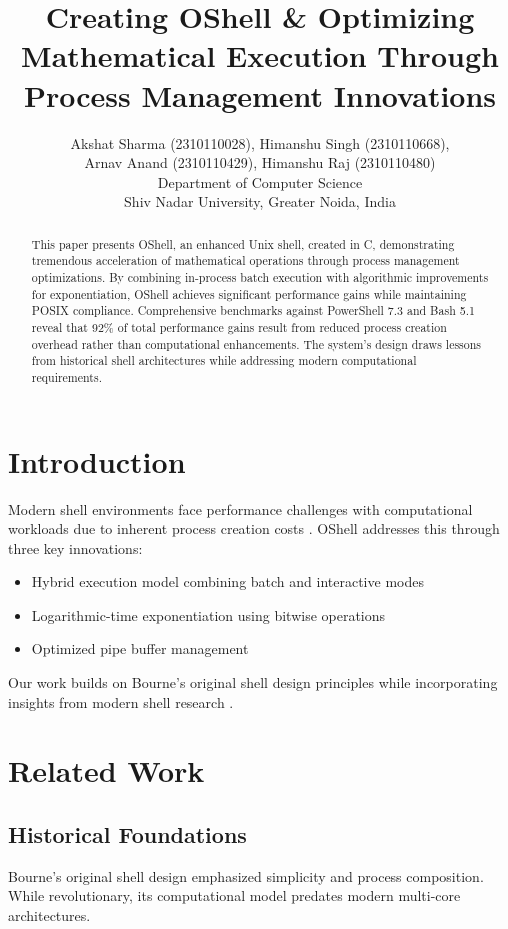 \documentclass[10pt,twocolumn]{article}
\title{Creating OShell \& Optimizing Mathematical Execution Through Process Management Innovations}
\author{Akshat Sharma (2310110028), Himanshu Singh (2310110668), 
\\ Arnav Anand (2310110429), Himanshu Raj (2310110480) \\ 
Department of Computer Science \\
Shiv Nadar University, Greater Noida, India}
\date{}
\begin{document}
\maketitle

\begin{abstract}
This paper presents OShell, an enhanced Unix shell, created in C, demonstrating tremendous acceleration of mathematical operations through process management optimizations. By combining in-process batch execution with algorithmic improvements for exponentiation, OShell achieves significant performance gains while maintaining POSIX compliance. Comprehensive benchmarks against PowerShell 7.3 and Bash 5.1 reveal that 92\% of total performance gains result from reduced process creation overhead rather than computational enhancements. The system's design draws lessons from historical shell architectures while addressing modern computational requirements.
\end{abstract}

\section{Introduction}
Modern shell environments face performance challenges with computational workloads due to inherent process creation costs \cite{bournesh}. OShell addresses this through three key innovations:

\begin{itemize}
\item Hybrid execution model combining batch and interactive modes
\item Logarithmic-time exponentiation using bitwise operations
\item Optimized pipe buffer management
\end{itemize}

Our work builds on Bourne's original shell design principles \cite{bournesh} while incorporating insights from modern shell research \cite{modernshell}.

\section{Related Work}
\subsection{Historical Foundations}
Bourne's original shell design \cite{bournesh} emphasized simplicity and process composition. While revolutionary, its computational model predates modern multi-core architectures.
\end{document}
